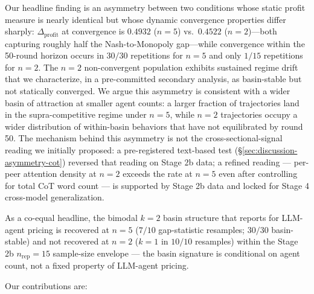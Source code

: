 Our headline finding is an asymmetry between two conditions whose static profit measure is
nearly identical but whose dynamic convergence properties differ sharply: $\Delta_{\text{profit}}$
at convergence is $0.4932$ ($n=5$) vs.\ $0.4522$ ($n=2$)---both capturing roughly half the
Nash-to-Monopoly gap---while convergence within the 50-round horizon occurs in $30/30$
repetitions for $n=5$ and only $1/15$ repetitions for $n=2$. The $n=2$ non-convergent
population exhibits sustained regime drift that we characterize, in a pre-committed secondary
analysis, as basin-stable but not statically converged. We argue this asymmetry is consistent
with a wider basin of attraction at smaller agent counts: a larger fraction of trajectories
land in the supra-competitive regime under $n=5$, while $n=2$ trajectories occupy a wider
distribution of within-basin behaviors that have not equilibrated by round 50. The mechanism
behind this asymmetry is not the cross-sectional-signal reading we initially proposed: a
pre-registered text-based test (\S\ref{sec:discussion-asymmetry-cot}) reversed that reading
on Stage 2b data; a refined reading --- per-peer attention density at $n = 2$ exceeds the
rate at $n = 5$ even after controlling for total CoT word count --- is supported by
Stage 2b data and locked for Stage 4 cross-model generalization.

As a co-equal headline, the bimodal $k = 2$ basin structure that \citet{Cao_2026_llm_collusion}
reports for LLM-agent pricing is recovered at $n = 5$ ($7/10$ gap-statistic resamples;
$30/30$ basin-stable) and not recovered at $n = 2$ ($k = 1$ in $10/10$ resamples)
within the Stage 2b $n_{\text{rep}} = 15$ sample-size envelope --- the basin signature
is conditional on agent count, not a fixed property of LLM-agent pricing.

Our contributions are:

